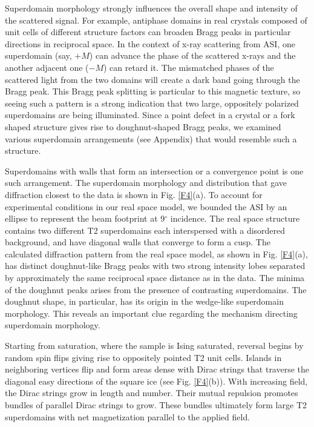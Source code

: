 \documentclass[aps, prb, reprint, showpacs, superscriptaddress]{revtex4-1}
\begin{document}
Superdomain morphology strongly influences the overall shape and intensity of the scattered signal.
For example, antiphase domains in real crystals composed of unit cells of different structure factors can broaden Bragg peaks in particular directions in reciprocal space. \cite{warren} 
In the context of x-ray scattering from ASI, one superdomain (say, $+M$) can advance the phase of the scattered x-rays and the another adjacent one ($-M$) can retard it. 
The mismatched phases of the scattered light from the two domains will create a dark band going through the Bragg peak.
This Bragg peak splitting is particular to this magnetic texture, so seeing such a pattern is a strong indication that two large, oppositely polarized superdomains are being illuminated. 
Since a point defect in a crystal or a fork shaped structure gives rise to doughnut-shaped Bragg peaks, we examined various superdomain arrangements (see Appendix) that would resemble such a structure. 

Superdomains with walls that form an intersection or a convergence point is one such arrangement. 
The superdomain morphology and distribution that gave diffraction closest to the data is shown in Fig. \ref{F4}(a).
To account for experimental conditions in our real space model, we bounded the ASI by an ellipse to represent the beam footprint at 9$^{\circ}$ incidence.
The real space structure contains two different T2 superdomains each interspersed with a disordered background, and have diagonal walls that converge to form a cusp. 
The calculated diffraction pattern from the real space model, as shown in Fig. \ref{F4}(a), has distinct doughnut-like Bragg peaks with two strong intensity lobes separated by approximately the same reciprocal space distance as in the data.
The minima of the doughnut peaks arises from the presence of contrasting superdomains.
The doughnut shape, in particular, has its origin in the wedge-like superdomain morphology. 
This reveals an important clue regarding the mechanism directing superdomain morphology.

Starting from saturation, where the sample is Ising saturated, reversal begins by random spin flips giving rise to oppositely pointed T2 unit cells.
Islands in neighboring vertices flip and form areas dense with Dirac strings that traverse the diagonal easy directions of the square ice (see Fig. \ref{F4}(b)).
With increasing field, the Dirac strings grow in length and number. 
Their mutual repulsion promotes bundles of parallel Dirac strings to grow. 
These bundles ultimately form large T2 superdomains with net magnetization parallel to the applied field.
\end{document}
